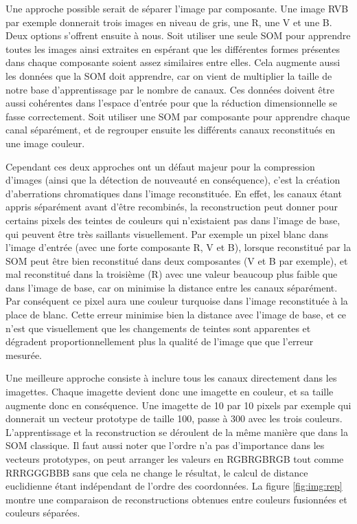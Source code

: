 	Une approche possible serait de séparer l'image par composante. Une image RVB par exemple donnerait trois images en niveau de gris, une R, une V et une B. Deux options s'offrent ensuite à nous. Soit utiliser une seule SOM pour apprendre toutes les images ainsi extraites en espérant que les différentes formes présentes dans chaque composante soient assez similaires entre elles. Cela augmente aussi les données que la SOM doit apprendre, car on vient de multiplier la taille de notre base d'apprentissage par le nombre de canaux. Ces données doivent être aussi cohérentes dans l'espace d'entrée pour que la réduction dimensionnelle se fasse correctement. Soit utiliser une SOM par composante pour apprendre chaque canal séparément, et de regrouper ensuite les différents canaux reconstitués en une image couleur. 
	
	Cependant ces deux approches ont un défaut majeur pour la compression d'images (ainsi que la détection de nouveauté en conséquence), c'est la création d'aberrations chromatiques dans l'image reconstituée. En effet, les canaux étant appris séparément avant d'être recombinés, la reconstruction peut donner pour certains pixels des teintes de couleurs qui n'existaient pas dans l'image de base, qui peuvent être très saillants visuellement. Par exemple un pixel blanc dans l'image d'entrée (avec une forte composante R, V et B), lorsque reconstitué par la SOM peut être bien reconstitué dans deux composantes (V et B par exemple), et mal reconstitué dans la troisième (R) avec une valeur beaucoup plus faible que dans l'image de base, car on minimise la distance entre les canaux séparément. Par conséquent ce pixel aura une couleur turquoise dans l'image reconstituée à la place de blanc. Cette erreur minimise bien la distance avec l'image de base, et ce n'est que visuellement que les changements de teintes sont apparentes et dégradent proportionnellement plus la qualité de l'image que que l'erreur mesurée.

	Une meilleure approche consiste à inclure tous les canaux directement dans les imagettes. Chaque imagette devient donc une imagette en couleur, et sa taille augmente donc en conséquence. Une imagette de 10 par 10 pixels par exemple qui donnerait un vecteur prototype de taille 100, passe à 300 avec les trois couleurs. L'apprentissage et la reconstruction se déroulent de la même manière que dans la SOM classique. Il faut aussi noter que l'ordre n'a pas d'importance dans les vecteurs prototypes, on peut arranger les valeurs en RGBRGBRGB tout comme RRRGGGBBB sans que cela ne change le résultat, le calcul de distance euclidienne étant indépendant de l'ordre des coordonnées. La figure \ref{fig:img:rep} montre une comparaison de reconstructions obtenues entre couleurs fusionnées et couleurs séparées.

